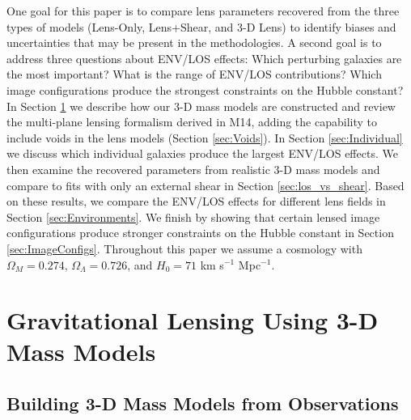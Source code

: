 \documentclass{emulateapj}
\begin{document}
One goal for this paper is to compare lens parameters recovered from the three types of models (Lens-Only, Lens+Shear, and 3-D Lens) to identify biases and uncertainties that may be present in the methodologies.  A second goal is to address three questions about ENV/LOS effects:
Which perturbing galaxies are the most important?
What is the range of ENV/LOS contributions?
Which image configurations produce the strongest constraints on the Hubble constant?
In Section \ref{sec:3DMassModels} we describe how our 3-D mass models are constructed and review the multi-plane lensing formalism derived in M14, adding the capability to include voids in the lens models (Section \ref{sec:Voids}).  In Section \ref{sec:Individual} we discuss which individual galaxies produce the largest ENV/LOS effects. We then examine the recovered parameters from realistic 3-D mass models and compare to fits with only an external shear in Section \ref{sec:los_vs_shear}. Based on these results, we compare the ENV/LOS effects for different lens fields in Section \ref{sec:Environments}. We finish by showing that certain lensed image configurations produce stronger constraints on the Hubble constant in Section \ref{sec:ImageConfigs}.  Throughout this paper we assume a cosmology with $\Omega_M = 0.274$, $\Omega_\Lambda = 0.726$, and $H_0 = 71$ km s$^{-1}$ Mpc$^{-1}$.

\section{Gravitational Lensing Using 3-D Mass Models}
\label{sec:3DMassModels}

\subsection{Building 3-D Mass Models from Observations}
\end{document}
